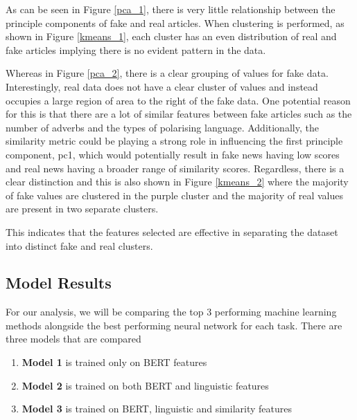 \documentclass{article}
\begin{document}
As can be seen in Figure \ref{pca_1}, there is very little relationship between the principle components of fake and real articles. When clustering is performed, as shown in Figure \ref{kmeans_1}, each cluster has an even distribution of real and fake articles implying there is no evident pattern in the data.

Whereas in Figure \ref{pca_2}, there is a clear grouping of values for fake data. Interestingly, real data does not have a clear cluster of values and instead occupies a large region of area to the right of the fake data. One potential reason for this is that there are a lot of similar features between fake articles such as the number of adverbs and the types of polarising language. Additionally, the similarity metric could be playing a strong role in influencing the first principle component, pc1, which would potentially result in fake news having low scores and real news having a broader range of similarity scores. Regardless, there is a clear distinction and this is also shown in Figure \ref{kmeans_2} where the majority of fake values are clustered in the purple cluster and the majority of real values are present in two separate clusters.

This indicates that the features selected are effective in separating the dataset into distinct fake and real clusters.

\subsection{Model Results}

For our analysis, we will be comparing the top 3 performing machine learning methods alongside the best performing neural network for each task. There are three models that are compared

\begin{enumerate}
  \item \textbf{Model 1} is trained only on BERT features
  \item \textbf{Model 2} is trained on both BERT and linguistic features
  \item \textbf{Model 3} is trained on BERT, linguistic and similarity features
\end{enumerate}
\end{document}

